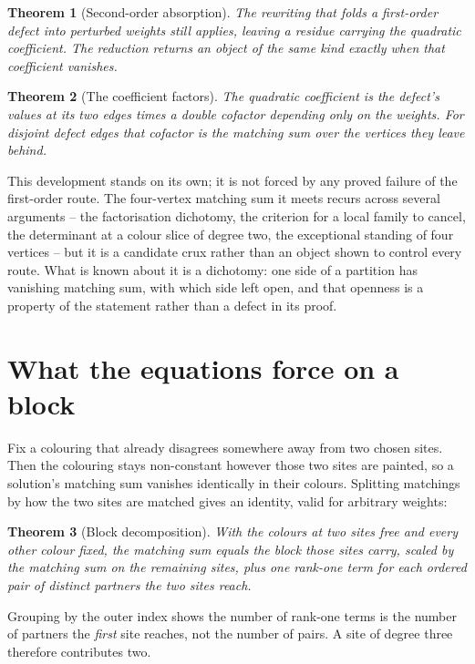 \documentclass[11pt]{article}
\newtheorem{theorem}{Theorem}[section]
\theoremstyle{definition}
\theoremstyle{remark}
\begin{document}
\begin{theorem}[Second-order absorption]
The rewriting that folds a first-order defect into perturbed weights still applies,
leaving a residue carrying the quadratic coefficient. The reduction returns an object
of the same kind exactly when that coefficient vanishes.
\end{theorem}

\begin{theorem}[The coefficient factors]
The quadratic coefficient is the defect's values at its two edges times a double
cofactor depending only on the weights. For disjoint defect edges that cofactor is the
matching sum over the vertices they leave behind.
\end{theorem}

This development stands on its own; it is not forced by any proved failure of the
first-order route. The four-vertex matching sum it meets recurs across several
arguments -- the factorisation dichotomy, the criterion for a local family to cancel,
the determinant at a colour slice of degree two, the exceptional standing of four
vertices -- but it is a candidate crux rather than an object shown to control every
route. What is known about it is a dichotomy: one side of a partition has vanishing
matching sum, with which side left open, and that openness is a property of the
statement rather than a defect in its proof.

\section{What the equations force on a block}\label{sec:blockrank}

Fix a colouring that already disagrees somewhere away from two chosen sites. Then the
colouring stays non-constant however those two sites are painted, so a solution's
matching sum vanishes identically in their colours. Splitting matchings by how the two
sites are matched gives an identity, valid for arbitrary weights:

\begin{theorem}[Block decomposition]
With the colours at two sites free and every other colour fixed, the matching sum
equals the block those sites carry, scaled by the matching sum on the remaining sites,
plus one rank-one term for each ordered pair of distinct partners the two sites reach.
\end{theorem}

Grouping by the outer index shows the number of rank-one terms is the number of
partners the \emph{first} site reaches, not the number of pairs. A site of degree three
therefore contributes two.
\end{document}
